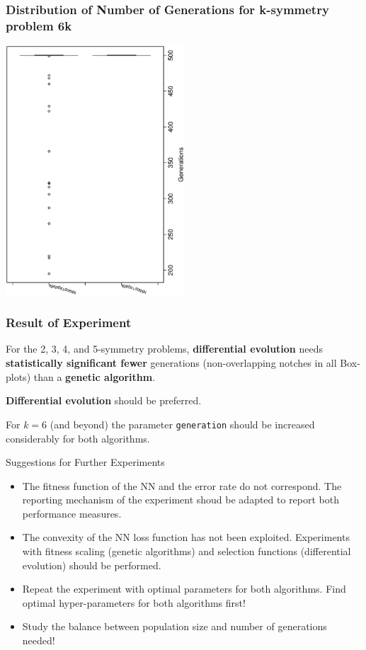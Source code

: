 \documentclass[18pt,c]{beamer}
\makeatletter
\let\beamer@writeslidentry@miniframeson=\beamer@writeslidentry
\newcommand*{\miniframeson}{\let\beamer@writeslidentry=\beamer@writeslidentry@miniframeson}
\makeatother
\begin{document}
 \begin{frame}
 \frametitle{ Distribution of Number of Generations for k-symmetry problem 6k }
 \begin{center}
\includegraphics[width=0.5\textwidth, angle=-90]
{ExpDboxplottGenerations004.eps}
 \end{center}
 \label{ExpDboxplottGenerations004.eps}  
 \end{frame}

\begin{frame}
\frametitle{
Result of Experiment
}
For the 2, 3, 4, and 5-symmetry problems,
{\bf differential evolution} needs {\bf statistically significant fewer} generations
(non-overlapping notches in all Box-plots) than a {\bf genetic algorithm}.
 
{\bf Differential evolution} should be preferred.
 
For $k=6$ (and beyond) the parameter {\tt generation} should be increased considerably
for both algorithms.
\end{frame}%
\begin{frame}
\vspace*{2mm}
\begin{block}{
Suggestions for Further Experiments
}
\begin{itemize}
\item The fitness function of the NN and the error rate do not correspond.
       The reporting mechanism of the experiment shoud be adapted to report both performance measures.
\item The convexity of the NN loss function has not been exploited.
       Experiments with fitness scaling (genetic algorithms)
       and selection functions (differential evolution) should be performed.
\item Repeat the experiment with optimal parameters for both algorithms.
       Find optimal hyper-parameters for both algorithms first!
\item Study the balance between population size and number of generations needed!
\end{itemize}
\end{block}
\end{frame}%
\miniframeson
\end{document}
